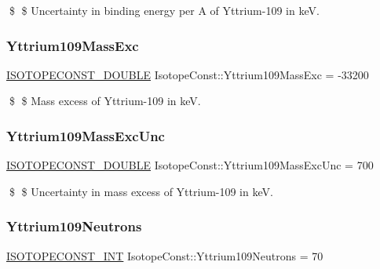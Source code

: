 \$ \$ Uncertainty in binding energy per A of Yttrium-\/109 in keV. \mbox{\label{group___isotope_const-_yttrium-_y109_ga18e02c1d8d52ffc57ec7fa7f80339cd2}} 
\subsubsection{\texorpdfstring{Yttrium109\+Mass\+Exc}{Yttrium109MassExc}}
{\footnotesize\ttfamily \mbox{\hyperlink{group___isotope_const-_macros_ga8f45a7272ce02c0b4c65c44636ed719a}{I\+S\+O\+T\+O\+P\+E\+C\+O\+N\+S\+T\+\_\+\+D\+O\+U\+B\+LE}} Isotope\+Const\+::\+Yttrium109\+Mass\+Exc = -\/33200}

\$ \$ Mass excess of Yttrium-\/109 in keV. \mbox{\label{group___isotope_const-_yttrium-_y109_ga70a160cf5a89aff8300215f13b838468}} 
\subsubsection{\texorpdfstring{Yttrium109\+Mass\+Exc\+Unc}{Yttrium109MassExcUnc}}
{\footnotesize\ttfamily \mbox{\hyperlink{group___isotope_const-_macros_ga8f45a7272ce02c0b4c65c44636ed719a}{I\+S\+O\+T\+O\+P\+E\+C\+O\+N\+S\+T\+\_\+\+D\+O\+U\+B\+LE}} Isotope\+Const\+::\+Yttrium109\+Mass\+Exc\+Unc = 700}

\$ \$ Uncertainty in mass excess of Yttrium-\/109 in keV. \mbox{\label{group___isotope_const-_yttrium-_y109_ga5321a8a57f23376c8ed6242ab5a932f0}} 
\subsubsection{\texorpdfstring{Yttrium109\+Neutrons}{Yttrium109Neutrons}}
{\footnotesize\ttfamily \mbox{\hyperlink{group___isotope_const-_macros_ga5f18360b3e99483a35c32d789e62621c}{I\+S\+O\+T\+O\+P\+E\+C\+O\+N\+S\+T\+\_\+\+I\+NT}} Isotope\+Const\+::\+Yttrium109\+Neutrons = 70}

